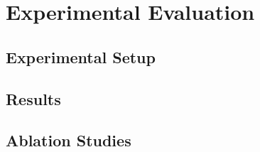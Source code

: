 \chapter{Experimental Evaluation}\label{ch:experimental_evaluation}



\section{Experimental Setup}




\section{Results}



\section{Ablation Studies}


